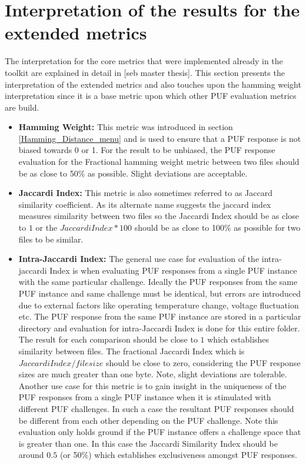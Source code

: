 \section{Interpretation of the results for the extended metrics}
The interpretation for the core metrics that were implemented already in the toolkit are explained in detail in [seb master thesis]. This section presents the interpretation of the extended metrics and also touches upon the hamming weight interpretation since it is a base metric upon which other PUF evaluation metrics are build.
\begin{itemize}
	\item \textbf{Hamming Weight:} This metric was introduced in section \ref{Hamming_Distance_menu} and is used to ensure that a PUF response is not biased towards 0 or 1. For the result to be unbiased, the PUF response evaluation for the Fractional hamming weight metric between two files should be as close to 50\% as possible. Slight deviations are acceptable.
	\item \textbf{Jaccardi Index:} This metric is also sometimes referred to as Jaccard similarity coefficient. As its alternate name suggests the jaccard index measures similarity between two files so the Jaccardi Index should be as close to $1$ or the $Jaccardi Index * 100$ should be as close to 100\% as possible for two files to be similar.
	\item \textbf{Intra-Jaccardi Index:} The general use case for evaluation of the intra-jaccardi Index is when evaluating PUF responses from a single PUF instance with the same particular challenge. Ideally the PUF responses from the same PUF instance and same challenge must be identical, but errors are introduced due to external factors like operating temperature change, voltage fluctuation etc. The PUF response from the same PUF instance are stored in a particular directory and evaluation
		for intra-Jaccardi Index is done for this entire folder. The result for each comparison should be close to $1$ which establishes similarity between files. The fractional Jaccardi Index which is $Jaccardi Index / filesize$ should be close to zero, considering the PUF response sizes are much greater than one byte. Note, slight deviations are tolerable. Another use case for this metric is to gain insight in the uniqueness of the PUF responses from a single PUF instance when
		it is stimulated with different PUF challenges. In such a case the resultant PUF responses should be different from each other depending on the PUF challenge. Note this evaluation only holds ground if the PUF instance offers a challenge space that is greater than one. In this case the Jaccardi Similarity Index should be around $0.5$ (or 50\%) which establishes exclusiveness amongst PUF responses.

\end{itemize}
